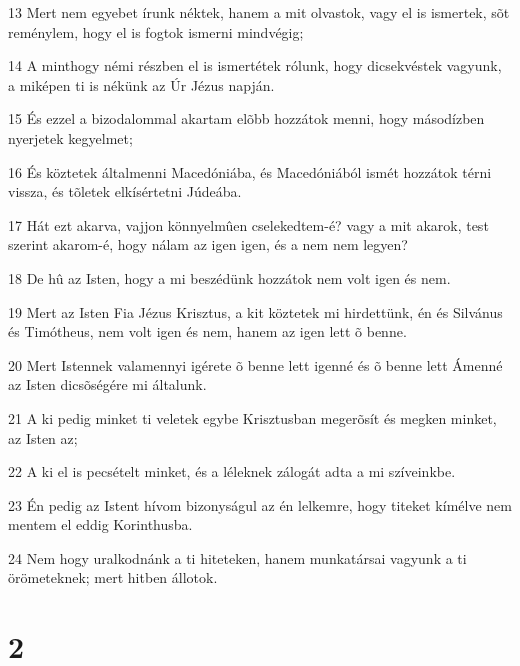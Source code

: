 \par 13 Mert nem egyebet írunk néktek, hanem a mit olvastok, vagy el is ismertek, sõt reménylem, hogy el is fogtok ismerni mindvégig;
\par 14 A minthogy némi részben el is ismertétek rólunk, hogy dicsekvéstek vagyunk, a miképen ti is nékünk az Úr Jézus napján.
\par 15 És ezzel a bizodalommal akartam elõbb hozzátok menni, hogy másodízben nyerjetek kegyelmet;
\par 16 És köztetek általmenni Macedóniába, és Macedóniából ismét hozzátok térni vissza, és tõletek elkísértetni Júdeába.
\par 17 Hát ezt akarva, vajjon könnyelmûen cselekedtem-é? vagy a mit akarok, test szerint akarom-é, hogy nálam az igen igen, és a nem nem legyen?
\par 18 De hû az Isten, hogy a mi beszédünk hozzátok nem volt igen és nem.
\par 19 Mert az Isten Fia Jézus Krisztus, a kit köztetek mi hirdettünk, én és Silvánus és Timótheus, nem volt igen és nem, hanem az igen lett õ benne.
\par 20 Mert Istennek valamennyi igérete õ benne lett igenné és õ benne lett Ámenné az Isten dicsõségére mi általunk.
\par 21 A ki pedig minket ti veletek egybe Krisztusban megerõsít és  megken minket, az Isten az;
\par 22 A ki el is pecsételt minket, és a léleknek zálogát adta a mi szíveinkbe.
\par 23 Én pedig az Istent hívom bizonyságul az én lelkemre, hogy titeket kímélve nem mentem el eddig Korinthusba.
\par 24 Nem hogy uralkodnánk a ti hiteteken, hanem munkatársai  vagyunk a ti örömeteknek; mert hitben állotok.

\chapter{2}

